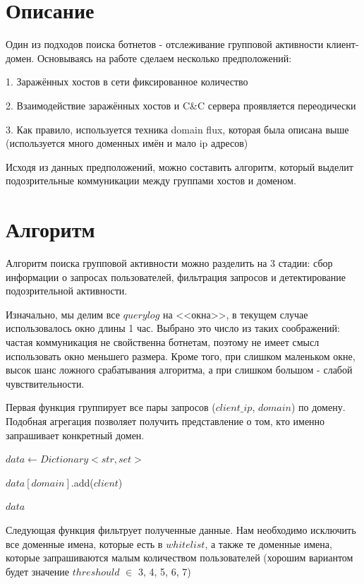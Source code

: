 \documentclass[14pt]{extreport}
\begin{document}
	\section{Описание}
	Один из подходов поиска ботнетов - отслеживание групповой активности клиент-домен. Основываясь на работе \cite{groupact} сделаем несколько предположений:
	
	1. Заражённых хостов в сети фиксированное количество
	
	2. Взаимодействие заражённых хостов и C\&C сервера проявляется переодически
	
	3. Как правило, используется техника domain flux, которая была описана выше (используется много доменных имён и мало ip адресов)
	
	Исходя из данных предположений, можно составить алгоритм, который выделит подозрительные коммуникации между группами хостов и доменом.
	
	\section{Алгоритм}
	
	Алгоритм поиска групповой активности можно разделить на 3 стадии: сбор информации о запросах пользователей, фильтрация запросов и детектирование подозрительной активности. 
	
	Изначально, мы делим все $querylog$ на <<окна>>, в текущем случае использовалось окно длины 1 час. Выбрано это число из таких соображений: частая коммуникация не свойственна ботнетам, поэтому не имеет смысл использовать окно меньшего размера. Кроме того, при слишком маленьком окне, высок шанс ложного срабатывания алгоритма, а при слишком большом - слабой чувствительности.
	
	Первая функция группирует все пары запросов ($client\_ip$, $domain$) по домену. Подобная агрегация позволяет получить представление о том, кто именно запрашивает конкретный домен.
	\begin{algorithmic}
	\State $data\gets Dictionary<str, set>$
	
		\State $data[domain]$.add($client$)
	\EndFor
	
	\State \Return $data$
	\EndFunction
	\end{algorithmic}

	Следующая функция фильтрует полученные данные. Нам необходимо исключить все доменные имена, которые есть в $whitelist$, а также те доменные имена, которые запрашиваются малым количеством пользователей (хорошим вариантом будет значение $threshould$ $\in$ 3, 4, 5, 6, 7)
	
\end{document}
